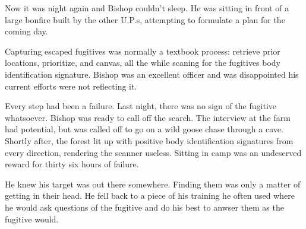 \documentclass[courier]{sffms}
\begin{document}
Now it was night again and Bishop couldn't sleep.
He was sitting in front of
a large bonfire built by the other U.P.s, attempting
to formulate a plan for the coming day.

Capturing escaped fugitives was normally a textbook
process: retrieve prior locations, prioritize, and
canvas, all the while scaning for the fugitives 
body identification signature. Bishop was an
excellent officer and was disappointed his current
efforts were not reflecting it.

Every step had been a failure. Last night, there was
no sign of the fugitive whatsoever. Bishop was ready
to call off the search. The interview at the farm had
potential, but was called off to go on a wild goose 
chase through a cave. Shortly after, the forest lit up
with positive body identification signatures from every
direction, rendering the scanner useless.
Sitting in camp was an undeserved reward for thirty
six hours of failure.

He knew his target was out there somewhere. Finding
them was only a matter of getting in their head. He
fell back to a piece of his training he often used where
he would ask questions of the fugitive and do his best
to anwser them as the fugitive would.
\end{document}
